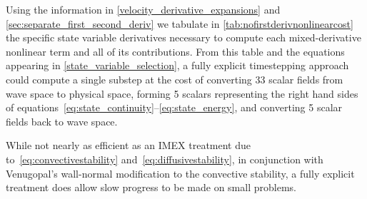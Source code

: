 \documentclass[letterpaper,11pt,nointlimits,reqno,draft]{amsbook}
\begin{document}
Using the information in \autoref{velocity_derivative_expansions}
and \autoref{sec:separate_first_second_deriv} we tabulate in
\autoref{tab:nofirstderivnonlinearcost} the specific state variable
derivatives necessary to compute each mixed-derivative nonlinear term and all
of its contributions.  From this table and the equations appearing in
\autoref{state_variable_selection}, a fully explicit timestepping approach
could compute a single substep at the cost of converting 33 scalar fields from
wave space to physical space, forming 5 scalars representing the right hand
sides of equations~\eqref{eq:state_continuity}--\eqref{eq:state_energy}, and
converting 5 scalar fields back to wave space.

While not nearly as efficient as an IMEX treatment due
to~\eqref{eq:convectivestability} and~\eqref{eq:diffusivestability}, in
conjunction with Venugopal's wall-normal modification to the convective
stability, a fully explicit treatment does allow slow progress to be made on
small problems.
\end{document}
